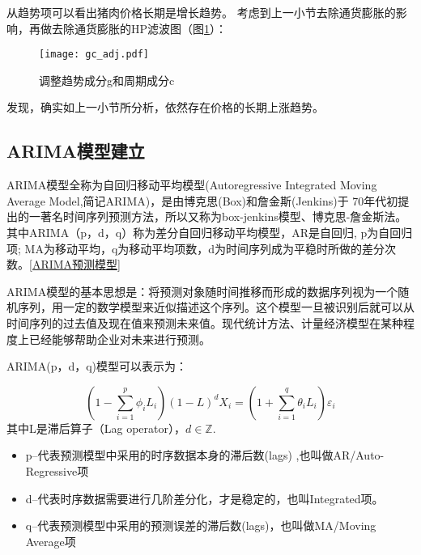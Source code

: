 \documentclass[a4paper,AutoFakeBold,AutoFakeSlant]{ctexart}
\begin{document}
从趋势项可以看出猪肉价格长期是增长趋势。
考虑到上一小节去除通货膨胀的影响，再做去除通货膨胀的HP滤波图（图\ref{f7}）：
\begin{figure}[H]
  \centering
  \texttt{[image: gc\_adj.pdf]}
  \caption{调整趋势成分g和周期成分c}
  \label{f7}
\end{figure}

发现，确实如上一小节所分析，依然存在价格的长期上涨趋势。


\subsection{ARIMA模型建立}

ARIMA模型全称为自回归移动平均模型(Autoregressive Integrated Moving Average Model,简记ARIMA)，是由博克思(Box)和詹金斯(Jenkins)于
70年代初提出的一著名时间序列预测方法，所以又称为box-jenkins模型、博克思-詹金斯法。其中ARIMA（p，d，q）称为差分自回归移动平均模型，AR是自回归, 
p为自回归项; MA为移动平均，q为移动平均项数，d为时间序列成为平稳时所做的差分次数。\ref{ARIMA预测模型}

ARIMA模型的基本思想是：将预测对象随时间推移而形成的数据序列视为一个随机序列，用一定的数学模型来近似描述这个序列。这个模型一旦被识别后就可以从
时间序列的过去值及现在值来预测未来值。现代统计方法、计量经济模型在某种程度上已经能够帮助企业对未来进行预测。

ARIMA(p，d，q)模型可以表示为：

\begin{equation}
  (1 - \sum_{i=1}^{p} \phi_i L_i)(1 - L)^d X_i = (1 + \sum_{i=1}^{q} \theta_i L_i) \varepsilon_i
\end{equation}
其中L是滞后算子（Lag operator），$d \in \mathbb{Z}$.

\begin{itemize}
  \item p--代表预测模型中采用的时序数据本身的滞后数(lags) ,也叫做AR/Auto-Regressive项
  \item d--代表时序数据需要进行几阶差分化，才是稳定的，也叫Integrated项。
  \item q--代表预测模型中采用的预测误差的滞后数(lags)，也叫做MA/Moving Average项
\end{itemize}

\end{document}

